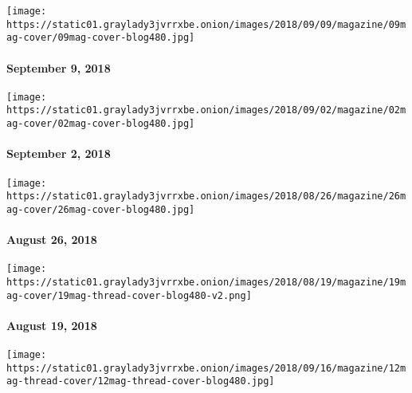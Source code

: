 \href{https://www.nytimes3xbfgragh.onion/issue/magazine/2018/09/06/the-9918-issue}{}

\texttt{[image: https://static01.graylady3jvrrxbe.onion/images/2018/09/09/magazine/09mag-cover/09mag-cover-blog480.jpg]}

\hypertarget{september-9-2018}{%
\paragraph{September 9, 2018}\label{september-9-2018}}

\href{https://www.nytimes3xbfgragh.onion/issue/magazine/2018/09/04/the-9218-issue}{}

\texttt{[image: https://static01.graylady3jvrrxbe.onion/images/2018/09/02/magazine/02mag-cover/02mag-cover-blog480.jpg]}

\hypertarget{september-2-2018}{%
\paragraph{September 2, 2018}\label{september-2-2018}}

\href{https://www.nytimes3xbfgragh.onion/issue/magazine/2018/08/24/the-82618-issue}{}

\texttt{[image: https://static01.graylady3jvrrxbe.onion/images/2018/08/26/magazine/26mag-cover/26mag-cover-blog480.jpg]}

\hypertarget{august-26-2018}{%
\paragraph{August 26, 2018}\label{august-26-2018}}

\href{https://www.nytimes3xbfgragh.onion/issue/magazine/2018/08/24/the-81918-issue}{}

\texttt{[image: https://static01.graylady3jvrrxbe.onion/images/2018/08/19/magazine/19mag-cover/19mag-thread-cover-blog480-v2.png]}

\hypertarget{august-19-2018}{%
\paragraph{August 19, 2018}\label{august-19-2018}}

\href{https://www.nytimes3xbfgragh.onion/issue/magazine/2018/08/24/the-81218-issue}{}

\texttt{[image: https://static01.graylady3jvrrxbe.onion/images/2018/09/16/magazine/12mag-thread-cover/12mag-thread-cover-blog480.jpg]}

